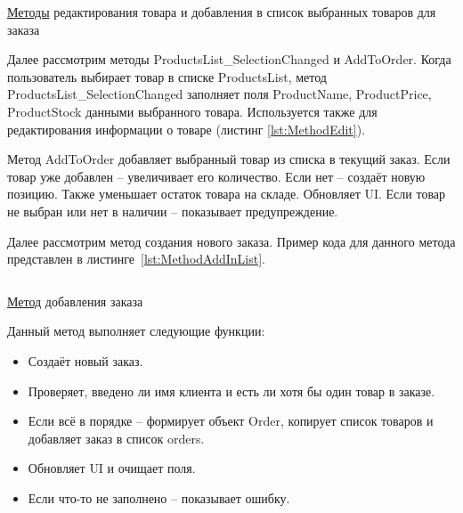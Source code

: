 \documentclass[12pt]{article}
\newcommand{\colorGIT}[1]{\textcolor{CtpLavender}{#1}}
\renewcommand{\texttt}[1]{{\small\ttfamily #1}}
\newenvironment{code}{\captionsetup{type=listing}}{}
\numberwithin{listing}{section}
\numberwithin{figure}{section}
\begin{document}
\begin{code}
	\inputminted[firstline=143, lastline=184]{csharp}{../../3lab/StoreManager/MainWindow.xaml.cs}
	\caption{\colorGIT{\href{https://github.com/WebMasterIT/Csharp_Labs/blob/ec375afd16c0647b337cf3d8a79c8bef904fc1be/3lab/StoreManager/MainWindow.xaml.cs\#L143-L184}{Методы}} редактирования товара и добавления в список выбранных товаров для заказа}
	\label{lst:MethodEdit}
\end{code}


Далее рассмотрим методы \texttt{ProductsList\_SelectionChanged} и \texttt{AddToOrder}. Когда пользователь выбирает товар в списке \texttt{ProductsList}, метод \texttt{ProductsList\_SelectionChanged} заполняет поля \texttt{Product\-Name}, \texttt{ProductPrice}, \texttt{ProductStock} данными выбранного товара. Используется также для редактирования информации о товаре (листинг \ref{lst:MethodEdit}).

Метод \texttt{AddToOrder} добавляет выбранный товар из списка в текущий заказ.
Если товар уже добавлен -- увеличивает его количество.
Если нет -- создаёт новую позицию.
Также уменьшает остаток товара на складе.
Обновляет \texttt{UI}.
Если товар не выбран или нет в наличии -- показывает предупреждение.

{}

Далее рассмотрим метод создания нового заказа. Пример кода для данного метода
представлен в листинге~\ref{lst:MethodAddInList}.

\begin{code}
	\inputminted[firstline=186, lastline=216]{csharp}{../../3lab/StoreManager/MainWindow.xaml.cs}
	\caption{\colorGIT{\href{https://github.com/WebMasterIT/Csharp_Labs/blob/ec375afd16c0647b337cf3d8a79c8bef904fc1be/3lab/StoreManager/MainWindow.xaml.cs\#L186-L216}{Метод}} добавления заказа}
	\label{lst:MethodAddInList}
\end{code}

\noindent Данный метод выполняет следующие функции:
\begin{itemize}
	\item Создаёт новый заказ.
	\item Проверяет, введено ли имя клиента и есть ли хотя бы один товар в заказе.
	\item Если всё в порядке -- формирует объект \texttt{Order}, копирует список товаров и добавляет заказ в список \texttt{orders}.
	\item Обновляет \texttt{UI} и очищает поля.
	\item Если что-то не заполнено -- показывает ошибку.
\end{itemize}
\end{document}
